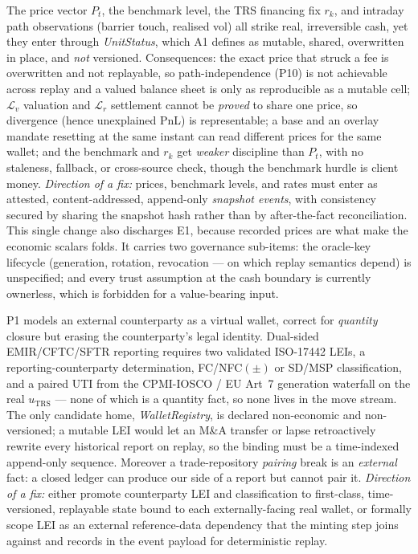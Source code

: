 \documentclass[11pt,a4paper]{article}
\begin{document}
\begin{description}[leftmargin=0pt,style=nextline]
\item[\textbf{E2 --- The observation surface is unversioned and unattested (the linchpin).}]
The price vector $P_t$, the benchmark level, the TRS financing fix $r_k$, and intraday path
observations (barrier touch, realised vol) all strike real, irreversible cash, yet they enter
through \textit{UnitStatus}, which A1 defines as mutable, shared, overwritten in place, and
\emph{not} versioned. Consequences: the exact price that struck a fee is overwritten and not
replayable, so path-independence (P10) is not achievable across replay and a valued balance sheet
is only as reproducible as a mutable cell; $\mathcal{L}_v$ valuation and $\mathcal{L}_r$
settlement cannot be \emph{proved} to share one price, so divergence (hence unexplained PnL) is
representable; a base and an overlay mandate resetting at the same instant can read different
prices for the same wallet; and the benchmark and $r_k$ get \emph{weaker} discipline than $P_t$,
with no staleness, fallback, or cross-source check, though the benchmark hurdle is client money.
\emph{Direction of a fix:} prices, benchmark levels, and rates must enter as attested,
content-addressed, append-only \emph{snapshot events}, with consistency secured by sharing the
snapshot hash rather than by after-the-fact reconciliation. This single change also discharges E1,
because recorded prices are what make the economic scalars folds. It carries two governance
sub-items: the oracle-key lifecycle (generation, rotation, revocation --- on which replay
semantics depend) is unspecified; and every trust assumption at the cash boundary is currently
ownerless, which is forbidden for a value-bearing input.

\item[\textbf{E3 --- The closed system is blind to counterparty legal identity.}]
P1 models an external counterparty as a virtual wallet, correct for \emph{quantity} closure but
erasing the counterparty's legal identity. Dual-sided EMIR/CFTC/SFTR reporting requires two
validated ISO-17442 LEIs, a reporting-counterparty determination, FC/NFC$(\pm)$ or SD/MSP
classification, and a paired UTI from the CPMI-IOSCO / EU Art~7 generation waterfall on the real
$u_{\mathrm{TRS}}$ --- none of which is a quantity fact, so none lives in the move stream. The only
candidate home, \textit{WalletRegistry}, is declared non-economic and non-versioned; a mutable LEI
would let an M\&A transfer or lapse retroactively rewrite every historical report on replay, so the
binding must be a time-indexed append-only sequence. Moreover a trade-repository \emph{pairing}
break is an \emph{external} fact: a closed ledger can produce our side of a report but cannot pair
it. \emph{Direction of a fix:} either promote counterparty LEI and classification to first-class,
time-versioned, replayable state bound to each externally-facing real wallet, or formally scope LEI
as an external reference-data dependency that the minting step joins against and records in the
event payload for deterministic replay.


\end{description}
\end{document}
